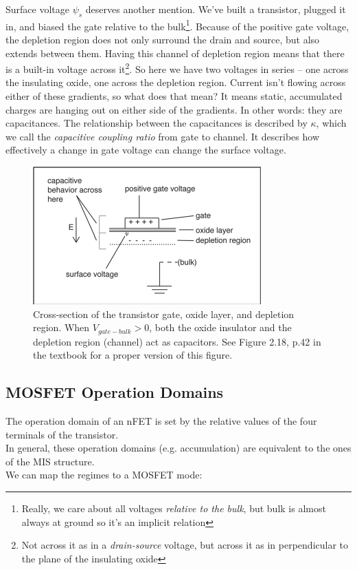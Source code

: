 \documentclass[main]{subfiles}
\begin{document}
Surface voltage $\psi_s$ deserves another mention. We've built a transistor, plugged it in, and biased the gate relative to the bulk\footnote{Really, we care about all voltages \emph{relative to the bulk}, but bulk is almost always at ground so it's an implicit relation}. Because of the positive gate voltage, the depletion region does not only surround the drain and source, but also extends between them. Having this channel of depletion region means that there is a built-in voltage across it\footnote{Not across it as in a \emph{drain-source} voltage, but across it as in perpendicular to the plane of the insulating oxide}. So here we have two voltages in series – one across the insulating oxide, one across the depletion region. Current isn't flowing across either of these gradients, so what does that mean? It means static, accumulated charges are hanging out on either side of the gradients. In other words: they are capacitances. The relationship between the capacitances is described by $\kappa$, which we call the \textsl{capacitive coupling ratio} from gate to channel. It describes how effectively a change in gate voltage can change the surface voltage.
\begin{figure}[hb]
 \centering
\includegraphics[natwidth=663,natheight=400]{figs/nme_xSection.pdf}
\caption{Cross-section of the transistor gate, oxide layer, and depletion region. When $V_{gate-bulk} > 0$, both the oxide insulator and the depletion region (channel) act as capacitors. See Figure 2.18, p.42 in the textbook for a proper version of this figure.\label{crossSectionCaps}}
\end{figure}

\subsection{MOSFET Operation Domains}
The operation domain of an nFET is set by the relative values of the four terminals of the transistor.\\
In general, these operation domains (e.g. accumulation) are equivalent to the ones of the MIS structure.\\
We can map the regimes to a MOSFET mode:
\end{document}
